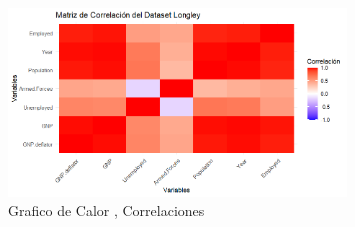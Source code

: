 \documentclass{article}
\begin{document}
\begin{figure}[h] %
    \centering %
    \includegraphics[width=0.8\textwidth]{Correlacion.png}
    \caption{Grafico de Calor , Correlaciones } %
    \label{fig:mi_imagen} %
\end{figure}
\end{document}
